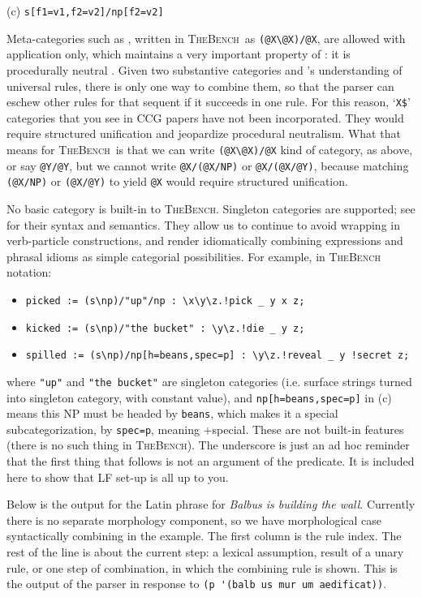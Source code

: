 \documentclass[11pt]{article}
\newcommand{\tool}{\textsc{TheBench}}
\begin{document}
(c) \verb|s[f1=v1,f2=v2]/np[f2=v2]| 

 
\noindent Meta-categories such as , written in \tool\, as \verb+(@X\@X)/@X+, are allowed with application only,
which maintains a very important property of : it is procedurally neutral \citep{pareschisteedman87}. Given two substantive categories and 's understanding of universal rules, there is only one way to combine them,
so that the parser can eschew other rules for that sequent if it succeeds in one rule. For this reason, `\verb|X$|' categories that you see in CCG papers
have not been incorporated. They would require structured unification and jeopardize procedural neutralism. What that means for \tool\, is that
we can write \verb+(@X\@X)/@X+ kind of category, as above, or say \verb+@Y/@Y+, but we cannot write \verb+@X/(@X/NP)+ or \verb+@X/(@X/@Y)+, because
matching \verb+(@X/NP)+ or \verb+(@X/@Y)+ to yield \verb+@X+ would require structured unification.


No basic category is built-in to \tool.
{Singleton categories are  supported; see \cite{bozs:18} for their syntax and semantics. They allow us to continue to avoid wrapping in verb-particle
constructions, and render idiomatically combining expressions and phrasal idioms as simple categorial possibilities. For example, in \tool\, notation:}

\begin{itemize}
\item[(a)] \verb|picked := (s\np)/"up"/np : \x\y\z.!pick _ y x z;|
\item[(b)] \verb|kicked := (s\np)/"the bucket" : \y\z.!die _ y z;|
\item[(c)] \verb|spilled := (s\np)/np[h=beans,spec=p] : \y\z.!reveal _ y !secret z;|
\end{itemize}
{where} \verb|"up"| {and} \verb|"the bucket"| 
{are singleton categories (i.e. surface
strings turned into singleton category, with constant value), and} \verb|np[h=beans,spec=p]| 
{in (c) means
this NP must be headed by} \verb|beans|, {which makes it a special
subcategorization, by} \verb|spec=p|, {meaning $+$special. These are not built-in features (there is no such thing in \tool).
The underscore is just an ad hoc reminder that
the first thing that follows is not an argument of the predicate.
It is included here to show that LF set-up is all up to you.}

Below is the output for the Latin phrase for \emph{Balbus is building the wall}. 
{Currently there is no separate morphology component, so we have morphological case syntactically combining in the example.}
The first column is the rule index. 
The rest of the line is about the current step: a lexical assumption, result of a unary rule, or one step of combination, in which the combining rule is shown. This is the output of the parser in response to \verb+(p '(balb us mur um aedificat))+.
\end{document}
